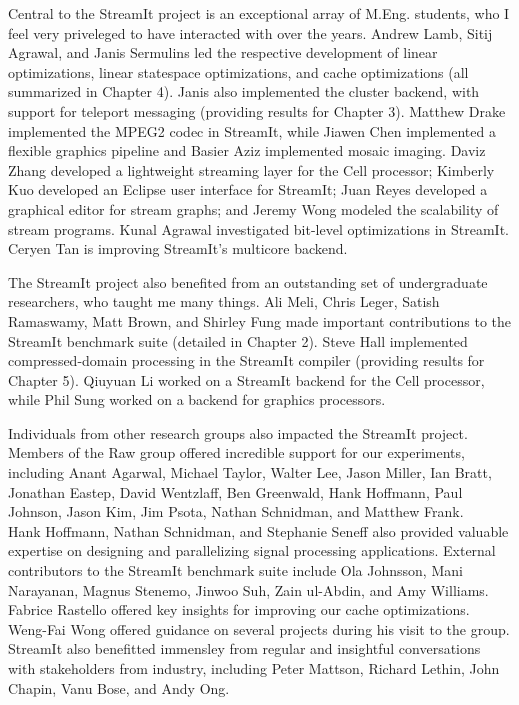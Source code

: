 Central to the StreamIt project is an exceptional array of
M.Eng. students, who I feel very priveleged to have interacted with
over the years.  Andrew Lamb, Sitij Agrawal, and Janis Sermulins led
the respective development of linear optimizations, linear statespace
optimizations, and cache optimizations (all summarized in Chapter 4).
Janis also implemented the cluster backend, with support for teleport
messaging (providing results for Chapter 3).  Matthew Drake
implemented the MPEG2 codec in StreamIt, while Jiawen Chen implemented
a flexible graphics pipeline and Basier Aziz implemented mosaic
imaging.  Daviz Zhang developed a lightweight streaming layer for the
Cell processor; Kimberly Kuo developed an Eclipse user interface for
StreamIt; Juan Reyes developed a graphical editor for stream graphs;
and Jeremy Wong modeled the scalability of stream programs.  Kunal
Agrawal investigated bit-level optimizations in StreamIt.  Ceryen Tan
is improving StreamIt's multicore backend.

The StreamIt project also benefited from an outstanding set of
undergraduate researchers, who taught me many things.  Ali Meli, Chris
Leger, Satish Ramaswamy, Matt Brown, and Shirley Fung made important
contributions to the StreamIt benchmark suite (detailed in Chapter 2).
Steve Hall implemented compressed-domain processing in the StreamIt
compiler (providing results for Chapter 5).  Qiuyuan Li worked on a
StreamIt backend for the Cell processor, while Phil Sung worked on a
backend for graphics processors.

Individuals from other research groups also impacted the StreamIt
project.  Members of the Raw group offered incredible support for our
experiments, including Anant Agarwal, Michael Taylor, Walter Lee,
Jason Miller, Ian Bratt, Jonathan Eastep, David Wentzlaff, Ben
Greenwald, Hank Hoffmann, Paul Johnson, Jason Kim, Jim Psota, Nathan
Schnidman, and Matthew Frank.
%
\newpage
\enlargethispage{0.3\baselineskip}
%
~ \vspace{-1.3\baselineskip}\\
\noindent Hank Hoffmann, Nathan Schnidman, and Stephanie Seneff also
provided valuable expertise on designing and parallelizing signal
processing applications.  External contributors to the StreamIt
benchmark suite include Ola Johnsson, Mani Narayanan, Magnus
Stenemo, Jinwoo Suh, Zain ul-Abdin, and Amy Williams.  Fabrice
Rastello offered key insights for improving our cache optimizations.
Weng-Fai Wong offered guidance on several projects during his visit
to the group.  StreamIt also benefitted immensley from regular and
insightful conversations with stakeholders from industry, including
Peter Mattson, Richard Lethin, John Chapin, Vanu Bose, and Andy Ong.

